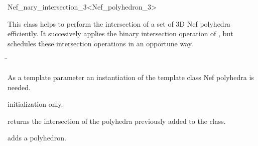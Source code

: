 
\begin{ccRefClass}{Nef_nary_intersection_3<Nef_polyhedron_3>}

\ccDefinition

This class helps to perform the intersection of a set of 3D Nef polyhedra
efficiently. It succesively applies the binary intersection operation of
, but schedules these intersection operations in an
opportune way.


\ccParameters

\begin{tabbing}
 \=\\
\end{tabbing}

As a template parameter an instantiation of the template class Nef
polyhedra is needed.

\ccCreation
{}

\ccThreeToTwo
{} {initialization only.}


{returns the intersection of the polyhedra previously added to the class.}

{adds a polyhedron.}


\end{ccRefClass}
